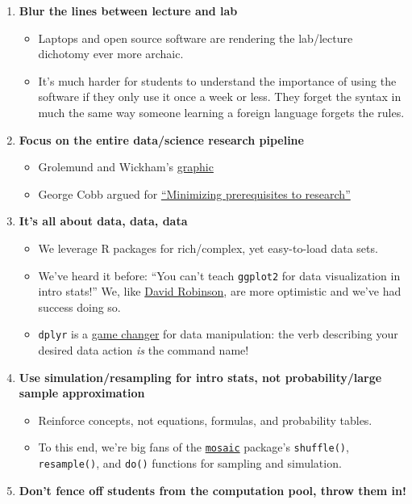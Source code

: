 \documentclass[]{tufte-book}
\providecommand{\tightlist}{%
  \setlength{\itemsep}{0pt}\setlength{\parskip}{0pt}}
\begin{document}
\begin{enumerate}
\def\labelenumi{\arabic{enumi}.}
\tightlist
\item
  \textbf{Blur the lines between lecture and lab}

  \begin{itemize}
  \tightlist
  \item
    Laptops and open source software are rendering the lab/lecture
    dichotomy ever more archaic.
  \item
    It's much harder for students to understand the importance of using
    the software if they only use it once a week or less. They forget
    the syntax in much the same way someone learning a foreign language
    forgets the rules.
  \end{itemize}
\item
  \textbf{Focus on the entire data/science research pipeline}

  \begin{itemize}
  \tightlist
  \item
    Grolemund and Wickham's
    \href{http://r4ds.had.co.nz/introduction.html}{graphic}
  \item
    George Cobb argued for
    \href{https://arxiv.org/abs/1507.05346}{``Minimizing prerequisites
    to research''}
  \end{itemize}
\item
  \textbf{It's all about data, data, data}

  \begin{itemize}
  \tightlist
  \item
    We leverage R packages for rich/complex, yet easy-to-load data sets.
  \item
    We've heard it before: ``You can't teach \texttt{ggplot2} for data
    visualization in intro stats!'' We, like
    \href{http://varianceexplained.org/r/teach_ggplot2_to_beginners/}{David
    Robinson}, are more optimistic and we've had success doing so.
  \item
    \texttt{dplyr} is a
    \href{http://chance.amstat.org/2015/04/setting-the-stage/}{game
    changer} for data manipulation: the verb describing your desired
    data action \emph{is} the command name!
  \end{itemize}
\item
  \textbf{Use simulation/resampling for intro stats, not
  probability/large sample approximation}

  \begin{itemize}
  \tightlist
  \item
    Reinforce concepts, not equations, formulas, and probability tables.
  \item
    To this end, we're big fans of the
    \href{https://github.com/ProjectMOSAIC/mosaic}{\texttt{mosaic}}
    package's \texttt{shuffle()}, \texttt{resample()}, and \texttt{do()}
    functions for sampling and simulation.
  \end{itemize}
\item
  \textbf{Don't fence off students from the computation pool, throw them
  in!}


\end{enumerate}
\end{document}
